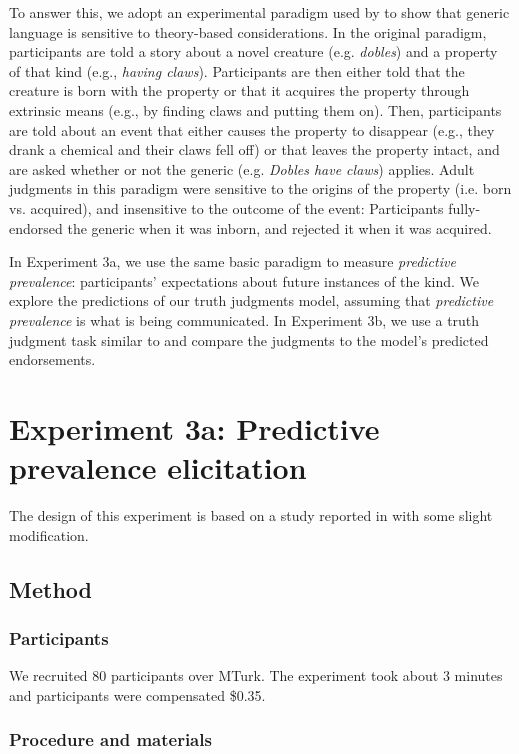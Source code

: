 \documentclass[12pt,letterpaper]{article}
\begin{document}
To answer this, we adopt an experimental paradigm used by  to show that generic language is sensitive to theory-based considerations.
In the original paradigm, participants are told a story about a novel creature (e.g. \emph{dobles}) and a property of that kind (e.g., \emph{having claws}).
Participants are then either told that the creature is born with the property or that it acquires the property through extrinsic means (e.g., by finding claws and putting them on). 
Then, participants are told about an event that either causes the property to disappear (e.g., they drank a chemical and their claws fell off) or that leaves the property intact, and are asked whether or not the generic (e.g. \emph{Dobles have claws}) applies.
Adult judgments in this paradigm were sensitive to the origins of the property (i.e. born vs. acquired), and insensitive to the outcome of the event: Participants fully-endorsed the generic when it was inborn, and rejected it when it was acquired.

In Experiment 3a, we use the same basic paradigm to measure \emph{predictive prevalence}: participants' expectations about future instances of the kind.
We explore the predictions of our truth judgments model, assuming that \emph{predictive prevalence} is what is being communicated.
In Experiment 3b, we use a truth judgment task similar to  and compare the judgments to the model's predicted endorsements.

\section*{Experiment 3a: Predictive prevalence elicitation}

The design of this experiment is based on a study reported in  with some slight modification.

\subsection*{Method}

\subsubsection*{Participants}
We recruited 80 participants over MTurk.  
The experiment took about 3 minutes and participants were compensated \$0.35.

\subsubsection*{Procedure and materials}
\end{document}
